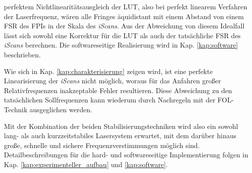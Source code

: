 perfektem Nichtlinearitätsausgleich der LUT, also bei perfekt linearem
Verfahren der Laserfrequenz, wären alle Fringes äquidistant mit einem Abstand
von einem FSR des FPIs in der Skala des \textit{iScans}. Aus der Abweichung von
diesem Idealfall lässt sich sowohl eine Korrektur für die LUT als auch der tatsächliche
FSR des \textit{iScans} berechnen. Die softwareseitige Realisierung wird in Kap.
\ref{kap:software} beschrieben.\par
Wie sich in Kap. \ref{kap:charakterisierung} zeigen wird, ist eine perfekte
Linearisierung der \textit{iScans} nicht möglich, woraus für das Anfahren großer
Relativfrequenzen inakzeptable Fehler resultieren. Diese Abweichung zu den
tatsächlichen Sollfrequenzen kann wiederum durch Nachregeln mit der
FOL-Technik ausgeglichen werden.\par
Mit der Kombination der beiden Stabilisierungstechniken wird also ein sowohl
lang- als auch kurzzeitstabiles Lasersystem erwartet, mit dem darüber hinaus große, schnelle und sichere Frequenzverstimmungen möglich sind.
Detailbeschreibungen für die hard- und softwareseitige Implementierung folgen in
Kap. \ref{kap:experimenteller_aufbau} und \ref{kap:software}.